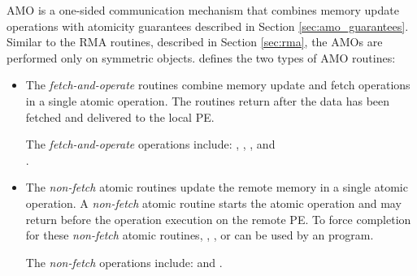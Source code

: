 \label{sec:amo}
\ac{AMO} is a one-sided communication mechanism that combines memory update operations with atomicity guarantees described in Section \ref{sec:amo_guarantees}. 
Similar to the \ac{RMA} routines, described in Section \ref{sec:rma},
the \acp{AMO} are performed only on symmetric objects. 
\openshmem{} defines the two types of \ac{AMO} routines:
\begin{itemize}
\item %
The \textit{fetch-and-operate} routines combine memory update and fetch 
operations in a single atomic operation.
The routines return after the data has been fetched and delivered to the local \ac{PE}.

The \textit{fetch-and-operate} operations include: , , , and\\ .

\item %
The \textit{non-fetch} atomic routines update the remote memory 
in a single atomic operation.
A \textit{non-fetch} atomic routine
starts the atomic operation and may return before the operation execution
on the remote \ac{PE}. 
To force completion for these \textit{non-fetch} atomic routines, , 
, or  can be used by an \openshmem{} program. 

The \textit{non-fetch} operations include:  and .
\end{itemize}

